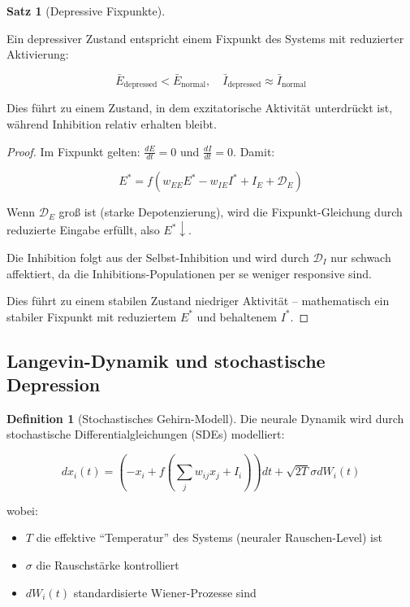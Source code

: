 \documentclass[a4paper,12pt]{article}
\theoremstyle{definition}
\newtheorem{definition}{Definition}
\newtheorem{satz}{Satz}
\begin{document}
\begin{satz}[Depressive Fixpunkte]
\label{satz:fixpunkte}

Ein depressiver Zustand entspricht einem Fixpunkt des Systems mit reduzierter Aktivierung:

\[
\bar{E}_{\text{depressed}} < \bar{E}_{\text{normal}}, \quad \bar{I}_{\text{depressed}} \approx \bar{I}_{\text{normal}}
\]

Dies führt zu einem Zustand, in dem exzitatorische Aktivität unterdrückt ist, während Inhibition relativ erhalten bleibt.
\end{satz}

\begin{proof}
Im Fixpunkt gelten: $\frac{dE}{dt} = 0$ und $\frac{dI}{dt} = 0$. Damit:

\[
E^* = f(w_{EE} E^* - w_{IE} I^* + I_E + \mathcal{D}_E)
\]

Wenn $\mathcal{D}_E$ groß ist (starke Depotenzierung), wird die Fixpunkt-Gleichung durch reduzierte Eingabe erfüllt, also $E^* \downarrow$.

Die Inhibition folgt aus der Selbst-Inhibition und wird durch $\mathcal{D}_I$ nur schwach affektiert, da die Inhibitions-Populationen per se weniger responsive sind.

Dies führt zu einem stabilen Zustand niedriger Aktivität -- mathematisch ein stabiler Fixpunkt mit reduziertem $E^*$ und behaltenem $I^*$.
\end{proof}

\subsection{Langevin-Dynamik und stochastische Depression}

\begin{definition}[Stochastisches Gehirn-Modell]
Die neurale Dynamik wird durch stochastische Differentialgleichungen (SDEs) modelliert:

\[
dx_i(t) = \left( -x_i + f\left( \sum_j w_{ij} x_j + I_i \right) \right) dt + \sqrt{2T} \sigma dW_i(t)
\]

wobei:
\begin{itemize}
	\item $T$ die effektive ``Temperatur'' des Systems (neuraler Rauschen-Level) ist
	\item $\sigma$ die Rauschstärke kontrolliert
	\item $dW_i(t)$ standardisierte Wiener-Prozesse sind
\end{itemize}
\end{definition}
\end{document}
